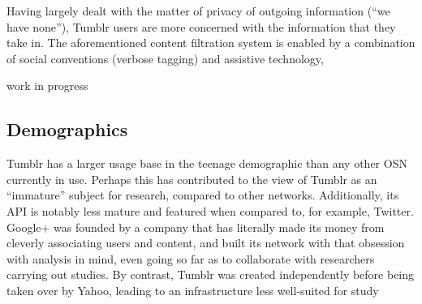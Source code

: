 Having largely dealt with the matter of privacy of outgoing information 
(``we have none''), Tumblr users are more concerned with the 
information that they take in.  The aforementioned content filtration 
system is enabled by a combination of social conventions (verbose 
tagging) and assistive technology\cite{tumblrsavior}, 


\hrulefill work in progress \hrulefill


\subsection{Demographics}
Tumblr has a larger usage base in the teenage demographic than any 
other OSN currently in use.  Perhaps this has contributed to the view 
of Tumblr as an ``immature'' subject for research, compared to other 
networks.  Additionally, its API is notably less mature and 
featured when compared to, for example, Twitter.  Google+ was founded 
by a company that has literally made its money from cleverly 
associating users and content, and built its network with that 
obsession with analysis in mind, even going so far as to collaborate 
with researchers carrying out studies\cite{kairam2012talking}.  By contrast, Tumblr was 
created independently before being taken over by Yahoo, leading to an 
infrastructure less well-suited for study

